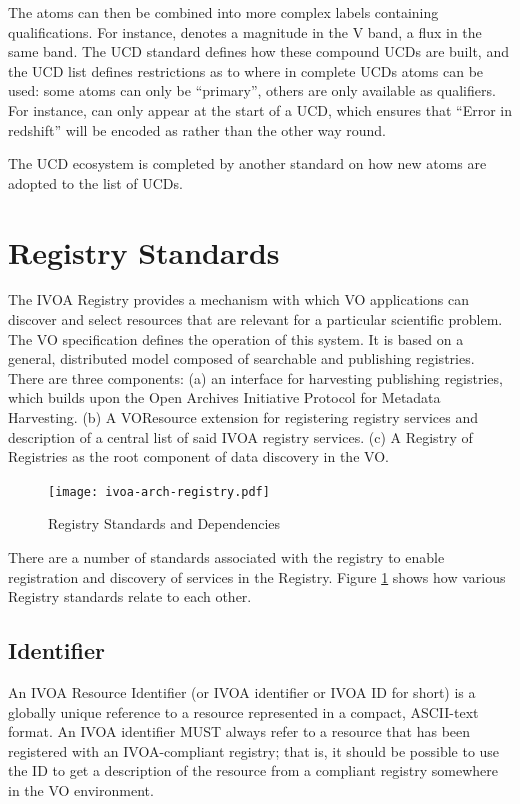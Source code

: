 \documentclass[11pt,letter]{ivoa}
\begin{document}
The atoms can then be combined into more complex labels containing
qualifications.  For instance,  denotes a
magnitude in the V band,  a flux in the same
band.  The UCD standard defines how these compound UCDs are built, and
the UCD list defines restrictions as to where in complete UCDs atoms can be
used: some atoms can only be ``primary'', others are only available
as qualifiers.  For instance,  can only appear at the
start of a UCD, which ensures that ``Error in redshift'' will be encoded
as  rather than the other way round.

The UCD ecosystem is completed by another standard on how new atoms are
adopted to the list of UCDs.

\section{Registry Standards}

The IVOA Registry provides a mechanism with which VO applications can
discover and select
resources that are relevant for a particular scientific problem. The VO
specification defines
the operation of this system. It is based on a general, distributed
model composed of searchable
and publishing registries. There are three components: (a) an interface
for harvesting publishing
registries, which builds upon the Open Archives Initiative Protocol for
Metadata Harvesting.
(b) A VOResource extension for registering registry services and
description of a central list
of said IVOA registry services. (c) A Registry of Registries as the root
component of data discovery
in the VO. 

\begin{figure}[ht]
\centering
\texttt{[image: ivoa-arch-registry.pdf]}
\caption{Registry Standards and Dependencies}
\label{fig:regdeps}
\end{figure}

There are a number of standards associated with the registry to enable
registration and discovery
of services in the Registry. Figure \ref{fig:regdeps} shows how various
Registry standards relate to each other.

\subsection{Identifier}

An IVOA Resource Identifier (or IVOA identifier or IVOA ID for short)
\citep{2016ivoa.spec.0523D} is a globally unique reference
to a resource represented in a compact, ASCII-text format. An IVOA
identifier MUST always refer to
a resource that has been registered with an IVOA-compliant registry;
that is, it should be possible
to use the ID to get a description of the resource from a compliant
registry somewhere in the VO
environment.
\end{document}
